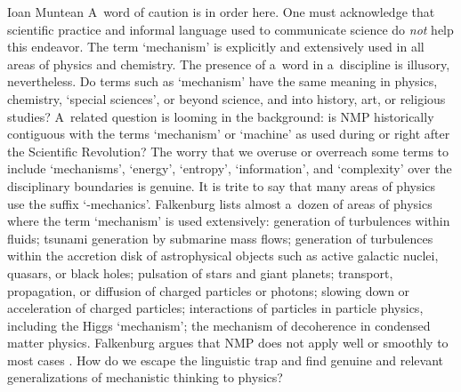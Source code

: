 \begin{recengenv}{Ioan Muntean}
A~word of caution is in order here. One must acknowledge that scientific practice and informal language used to communicate science do \textit{not} help this endeavor. The term ‘mechanism' is explicitly and extensively used in all areas of physics and chemistry. The presence of a~word in a~discipline is illusory, nevertheless. Do terms such as ‘mechanism' have the same meaning in physics, chemistry, ‘special sciences', or beyond science, and into history, art, or religious studies? A~related question is looming in the background: is NMP historically contiguous with the terms ‘mechanism' or ‘machine' as used during or right after the Scientific Revolution? The worry that we overuse or overreach some terms to include ‘mechanisms', ‘energy', ‘entropy', ‘information', and ‘complexity' over the disciplinary boundaries is genuine. It is trite to say that many areas of physics use the suffix ‘-mechanics'. Falkenburg lists almost a~dozen of areas of physics where the term ‘mechanism' is used extensively: generation of turbulences within fluids; tsunami generation by submarine mass flows; generation of turbulences within the accretion disk of astrophysical objects such as active galactic nuclei, quasars, or black holes; pulsation of stars and giant planets; transport, propagation, or diffusion of charged particles or photons; slowing down or acceleration of charged particles; interactions of particles in particle physics, including the Higgs ‘mechanism'; the mechanism of decoherence in condensed matter physics. Falkenburg argues that NMP does not apply well or smoothly to most cases
\parencite[][pp.84–85]{falkenburg_mechanistic_2019}. %
 How do we escape the linguistic trap and find genuine and relevant generalizations of mechanistic thinking to physics?


\end{recengenv}
